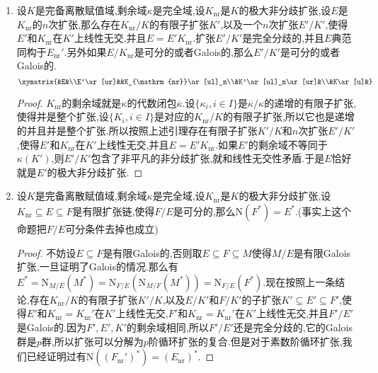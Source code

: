 \begin{enumerate}
\begin{proof}
    	设$M/L$的一组基为$\{m_{\alpha},\alpha=1,2,\cdots,n\}$,我们记$m_{\alpha}m_{\beta}=\sum_{\gamma}c_{\alpha\beta}^{\gamma}m_{\gamma}$,其中$c_{\alpha\beta}^{\gamma}\in L$.选取指标$i$足够大使得每个$c_{\alpha\beta}^{\gamma}\in L_i$,那么$M_i=L_i(m_1,\cdots,m_n)$就满足$M_i\otimes_{L_i}L=M$.于是此时$M_i$和$L$在$L_i$上线性无交.如果设$M/L$是可分的,不妨设特征$p>0$,【】
    \end{proof}
    \item 设$K$是完备离散赋值域,剩余域$\kappa$是完全域,设$K_{\mathrm{nr}}$是$K$的极大非分歧扩张,设$E$是$K_{\mathrm{nr}}$的$n$次扩张,那么存在$K_{\mathrm{nr}}/K$的有限子扩张$K'$,以及一个$n$次扩张$E'/K'$,使得$E'$和$K_{\mathrm{nr}}$在$K'$上线性无交,并且$E=E'K_{\mathrm{nr}}$.扩张$E'/K'$是完全分歧的,并且$E$典范同构于$E_{\mathrm{nr}}'$.另外如果$E/K_{\mathrm{nr}}$是可分的或者Galois的,那么$E'/K'$是可分的或者Galois的.
    $$\xymatrix{&E&\\E'\ar[ur]&&K_{\mathrm{nr}}\ar[ul]_n\\&K'\ar[ul]_n\ar[ur]&\\&K\ar[u]&}$$
    \begin{proof}
    	
    	$K_{\mathrm{nr}}$的剩余域就是$\kappa$的代数闭包$\overline{\kappa}$.设$\{\kappa_i,i\in I\}$是$\overline{\kappa}/\kappa$的递增的有限子扩张,使得并是整个扩张,设$\{K_i,i\in I\}$是对应的$K_{\mathrm{nr}}/K$的有限子扩张,所以它也是递增的并且并是整个扩张.所以按照上述引理存在有限子扩张$K'/K$和$n$次扩张$E'/K'$,使得$E'$和$K_{\mathrm{nr}}$在$K'$上线性无交,并且$E=E'K_{\mathrm{nr}}$.如果$E'$的剩余域不等同于$\kappa(K')$,则$E'/K'$包含了非平凡的非分歧扩张,就和线性无交性矛盾.于是$E$恰好就是$E'$的极大非分歧扩张.
    \end{proof}
    \item 设$K$是完备离散赋值域,剩余域$\kappa$是完全域,设$K_{\mathrm{nr}}$是$K$的极大非分歧扩张,设$K_{\mathrm{nr}}\subseteq E\subseteq F$是有限扩张链,使得$F/E$是可分的,那么$\mathrm{N}(F^*)=E^*$.(事实上这个命题把$F/E$可分条件去掉也成立)
    \begin{proof}
    	
    	不妨设$E\subseteq F$是有限Galois的,否则取$E\subseteq F\subseteq M$使得$M/E$是有限Galois扩张,一旦证明了Galois的情况.那么有$E^*=\mathrm{N}_{M/E}(M^*)=\mathrm{N}_{F/E}(\mathrm{N}_{M/F}(M^*))=\mathrm{N}_{F/E}(F^*)$.现在按照上一条结论,存在$K_{\mathrm{nr}}/K$的有限子扩张$K'/K$,以及$E/K'$和$F/K'$的子扩张$K'\subseteq E'\subseteq F'$,使得$E'$和$K_{\mathrm{nr}}=K_{\mathrm{nr}}'$在$K'$上线性无交,$F'$和$K_{\mathrm{nr}}=K_{\mathrm{nr}}'$在$K'$上线性无交,并且$F'/E'$是Galois的.因为$F',E',K'$的剩余域相同,所以$F'/E'$还是完全分歧的,它的Galois群是$p$群,所以扩张可以分解为$p$阶循环扩张的复合.但是对于素数阶循环扩张,我们已经证明过有$\mathrm{N}((F_{\mathrm{nr}}')^*)=(E_{\mathrm{nr}})^*$.
    \end{proof}
\end{enumerate}

